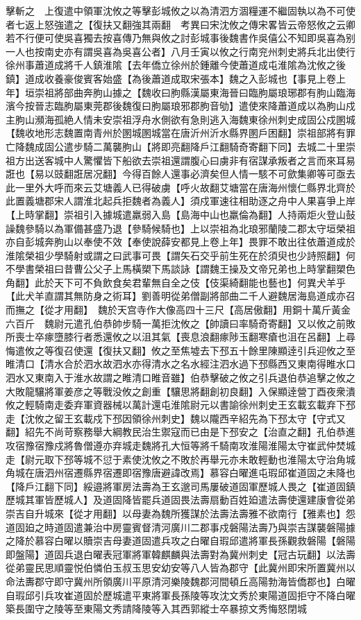 擊斬之　上復遣中領軍沈攸之等擊彭城攸之以為清泗方涸糧運不繼固執以為不可使者七返上怒強遣之【復扶又翻強其兩翻　考異曰宋沈攸之傳宋畧皆云帝怒攸之云卿若不行便可使吳喜獨去按喜傳乃無與攸之討彭城事後魏書作吳僖公不知即吳喜為别一人也按南史亦有謂吳喜為吳喜公者】八月壬寅以攸之行南兖州刺史將兵北出使行徐州事蕭道成將千人鎮淮隂【去年僑立徐州於鍾離今使蕭道成屯淮隂為沈攸之後鎮】道成收養豪俊賓客始盛【為後蕭道成取宋張本】魏之入彭城也【事見上卷上年】垣崇祖將部曲奔朐山據之【魏收曰胊縣漢屬東海晉曰臨朐屬琅琊郡有朐山臨海濱今按晉志臨朐屬東莞郡後魏復曰朐屬琅邪郡朐音劬】遣使來降蕭道成以為朐山戍主朐山瀕海孤絶人情未安崇祖浮舟水側欲有急則逃入海魏東徐州刺史成固公戍圂城【魏收地形志魏置南青州於圂城圂城當在唐沂州沂水縣界圂戶困翻】崇祖部將有罪亡降魏成固公遣步騎二萬襲朐山【將即亮翻降戶江翻騎奇寄翻下同】去城二十里崇祖方出送客城中人驚懼皆下船欲去崇祖還謂腹心曰虜非有宿謀承叛者之言而來耳易誑也【易以豉翻誑居况翻】今得百餘人還事必濟矣但人情一駭不可歛集卿等可亟去此一里外大呼而來云艾塘義人已得破虜【呼火故翻艾塘當在唐海州懷仁縣界北齊於此置義塘郡宋人謂淮北起兵拒魏者為義人】須戍軍速往相助逐之舟中人果喜爭上岸【上時掌翻】崇祖引入據城遣羸弱入島【島海中山也羸倫為翻】人持兩炬火登山鼔譟魏參騎以為軍備甚盛乃退【參騎候騎也】上以崇祖為北琅邪蘭陵二郡太守垣榮祖亦自彭城奔朐山以奉使不效【奉使說薛安都見上卷上年】畏罪不敢出往依蕭道成於淮隂榮祖少學騎射或謂之曰武事可畏【謂矢石交乎前生死在於須臾也少詩照翻】何不學書榮祖曰昔曹公父子上馬橫槊下馬談詠【謂魏王操及文帝兄弟也上時掌翻槊色角翻】此於天下可不負飲食矣君輩無自全之伎【伎渠綺翻能也藝也】何異犬羊乎【此犬羊直謂其無防身之術耳】劉善明從弟僧副將部曲二千人避魏居海島道成亦召而撫之【從才用翻】　魏於天宫寺作大像高四十三尺【高居傲翻】用銅十萬斤黃金六百斤　魏尉元遣孔伯恭帥步騎一萬拒沈攸之【帥讀曰率騎奇寄翻】又以攸之前敗所喪士卒瘃墮膝行者悉還攸之以沮其氣【喪息浪翻瘃陟玉翻寒瘡也沮在呂翻】上尋悔遣攸之等復召使還【復扶又翻】攸之至焦墟去下邳五十餘里陳顯逹引兵迎攸之至睢清口【清水合於泗水故泗水亦得清水之名水經注泗水過下邳縣西又東南得睢水口泗水又東南入于淮水故謂之睢清口睢音雖】伯恭擊破之攸之引兵退伯恭追擊之攸之大敗龍驤將軍姜彦之等戰没攸之創重【驤思將翻創初良翻】入保顯逹營丁酉夜衆潰攸之輕騎南走委弃軍資器械以萬計還屯淮隂尉元以書諭徐州刺史王玄載玄載弃下邳走【沈攸之留王玄載戍下邳因領徐州刺史】魏以隴西辛紹先為下邳太守【守式又翻】紹先不尚苛察務舉大綱教民治生禦寇而已由是下邳安之【治直之翻】孔伯恭進攻宿豫宿豫戍將魯僧遵亦弃城走魏將孔大恒等將千騎南攻淮陽淮陽太守崔武仲焚城走【尉元取下邳等城不愆于素使沈攸之不敗於再舉元亦未敢輕動也淮陽太守治角城角城在唐泗州宿遷縣界宿遷即宿豫唐避諱改焉】慕容白曜進屯瑕邱崔道固之未降也【降戶江翻下同】綏邉將軍房法壽為王玄邈司馬屢破道固軍歷城人畏之【崔道固鎮歷城其軍皆歷城人】及道固降皆罷兵道固畏法壽扇動百姓廹遣法壽使還建康會從弟崇吉自升城來【從才用翻】以母妻為魏所獲謀於法壽法壽雅不欲南行【雅素也】怨道固廹之時道固遣兼治中房靈賓督清河廣川二郡事戍磐陽法壽乃與崇吉謀襲磐陽據之降於慕容白曜以贖崇吉母妻道固遣兵攻之白曜自瑕邱遣將軍長孫觀救磐陽【磐陽即盤陽】道固兵退白曜表冠軍將軍韓麒麟與法壽對為冀州刺史【冠古玩翻】以法壽從弟靈民思順靈悦伯憐伯玉叔玉思安幼安等八人皆為郡守【此冀州即宋所置冀州以命法夀郡守即守冀州所領廣川平原清河樂陵魏郡河間頓丘高陽勃海皆僑郡也】白曜自瑕邱引兵攻崔道固於歷城遣平東將軍長孫陵等攻沈文秀於東陽道固拒守不降白曜築長圍守之陵等至東陽文秀請降陵等入其西郭縱士卒暴掠文秀悔怒閉城
